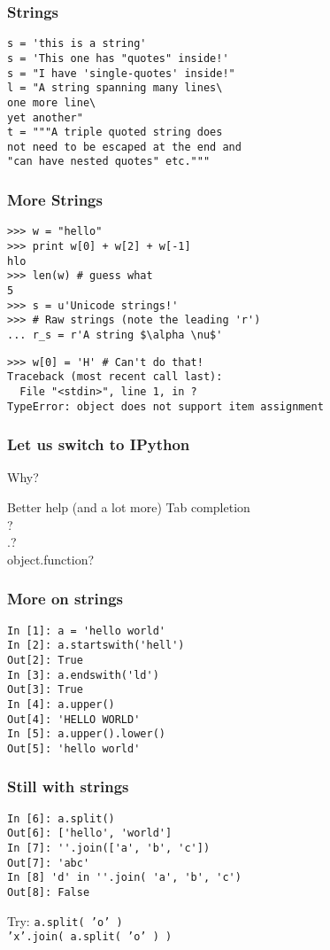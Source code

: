 \documentclass[14pt,compress]{beamer}
\begin{document}
\begin{frame}[fragile]
  \frametitle{Strings}
  \begin{lstlisting}
s = 'this is a string'
s = 'This one has "quotes" inside!'
s = "I have 'single-quotes' inside!"
l = "A string spanning many lines\
one more line\
yet another"
t = """A triple quoted string does
not need to be escaped at the end and 
"can have nested quotes" etc."""
  \end{lstlisting}
\end{frame}

\begin{frame}[fragile]
  \frametitle{More Strings}
  \vspace*{-0.2in}
  \begin{lstlisting}
>>> w = "hello"    
>>> print w[0] + w[2] + w[-1]
hlo
>>> len(w) # guess what
5
>>> s = u'Unicode strings!'
>>> # Raw strings (note the leading 'r')
... r_s = r'A string $\alpha \nu$'
  \end{lstlisting}
\pause
  \begin{lstlisting}
>>> w[0] = 'H' # Can't do that!
Traceback (most recent call last):
  File "<stdin>", line 1, in ?
TypeError: object does not support item assignment
  \end{lstlisting}
\end{frame}

\begin{frame}
  \frametitle{Let us switch to IPython}
  Why?
  \begin{block}
    {Better help (and a lot more)}
    Tab completion\\
    ?\\
    .?\\
    object.function?
  \end{block}
\end{frame}

\begin{frame}[fragile]
  \frametitle{More on strings}
  \begin{lstlisting}
In [1]: a = 'hello world'
In [2]: a.startswith('hell')
Out[2]: True
In [3]: a.endswith('ld')
Out[3]: True
In [4]: a.upper()
Out[4]: 'HELLO WORLD'
In [5]: a.upper().lower()
Out[5]: 'hello world'
  \end{lstlisting}
\end{frame}

\begin{frame}[fragile]\frametitle{Still with strings}
  \begin{lstlisting}
In [6]: a.split()
Out[6]: ['hello', 'world']
In [7]: ''.join(['a', 'b', 'c'])
Out[7]: 'abc'
In [8] 'd' in ''.join( 'a', 'b', 'c')
Out[8]: False
  \end{lstlisting}
  \begin{block}{Try:}
    \texttt{a.split( 'o' )}\\
    \texttt{'x'.join( a.split( 'o' ) )}
  \end{block}
\end{frame}
\end{document}
